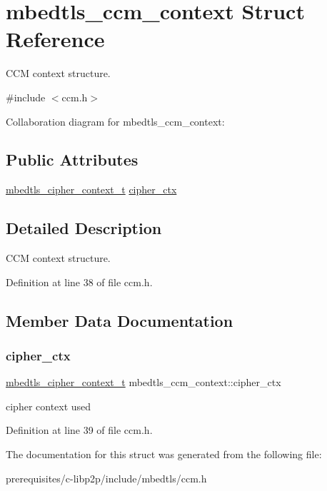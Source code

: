 \hypertarget{structmbedtls__ccm__context}{}\section{mbedtls\+\_\+ccm\+\_\+context Struct Reference}
\label{structmbedtls__ccm__context}


C\+CM context structure.  




{\ttfamily \#include $<$ccm.\+h$>$}



Collaboration diagram for mbedtls\+\_\+ccm\+\_\+context\+:
\subsection*{Public Attributes}
\begin{DoxyCompactItemize}
\item 
\mbox{\hyperlink{structmbedtls__cipher__context__t}{mbedtls\+\_\+cipher\+\_\+context\+\_\+t}} \mbox{\hyperlink{structmbedtls__ccm__context_a6d270f32b6d211bc94be981ac7572b1e}{cipher\+\_\+ctx}}
\end{DoxyCompactItemize}


\subsection{Detailed Description}
C\+CM context structure. 

Definition at line 38 of file ccm.\+h.



\subsection{Member Data Documentation}
\mbox{\label{structmbedtls__ccm__context_a6d270f32b6d211bc94be981ac7572b1e}} 
\subsubsection{\texorpdfstring{cipher\+\_\+ctx}{cipher\_ctx}}
{\footnotesize\ttfamily \mbox{\hyperlink{structmbedtls__cipher__context__t}{mbedtls\+\_\+cipher\+\_\+context\+\_\+t}} mbedtls\+\_\+ccm\+\_\+context\+::cipher\+\_\+ctx}

cipher context used 

Definition at line 39 of file ccm.\+h.



The documentation for this struct was generated from the following file\+:\begin{DoxyCompactItemize}
\item 
prerequisites/c-\/libp2p/include/mbedtls/ccm.\+h\end{DoxyCompactItemize}
